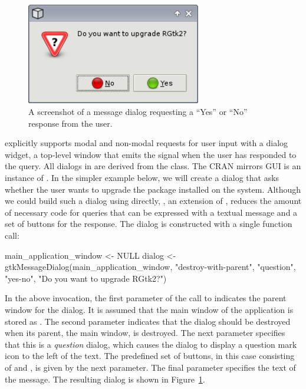 \documentclass[article,shortnames]{jss}
\begin{document}
\begin{figure}[tbp]
  \begin{center}
    \includegraphics[width=3in]{upgrade-dialog.png}
    \caption{\label{fig:upgrade-dialog}A screenshot of a message
dialog
      requesting a 
      ``Yes'' or ``No'' response from the user.}
  \end{center}
\end{figure}

 explicitly supports modal and non-modal requests for user
input with a dialog widget, a top-level window that emits the
 signal when the user has responded to the query. All
dialogs in  are derived from the  class. The
CRAN mirrors GUI is an instance of . In the simpler
example below,
we will create a dialog that asks whether the user wants to upgrade
the  package installed on the system. Although we could
build such a dialog using  directly,
, an extension of , reduces the
amount of necessary code
for queries that can be expressed with a textual message and a
set of buttons for the response. The dialog is constructed with a
single function call:
\begin{Code}
main_application_window <- NULL
dialog <- gtkMessageDialog(main_application_window,  
                           "destroy-with-parent", "question",
                           "yes-no", "Do you want to upgrade RGtk2?")
\end{Code}
In the above invocation, the first parameter of the call to 
 indicates the parent window for the dialog. It
is assumed that the main window of the application is stored as
. The second parameter indicates that
the dialog should be destroyed when its parent, the main window, is
destroyed.  The next parameter specifies that this is a
\emph{question} dialog, which causes the dialog to display a question
mark icon to the left of the text.  The predefined set of buttons, in
this case consisting of  and , is given by the next
parameter. The final parameter specifies the text of the message.  The
resulting dialog is shown in Figure~\ref{fig:upgrade-dialog}.
\end{document}
